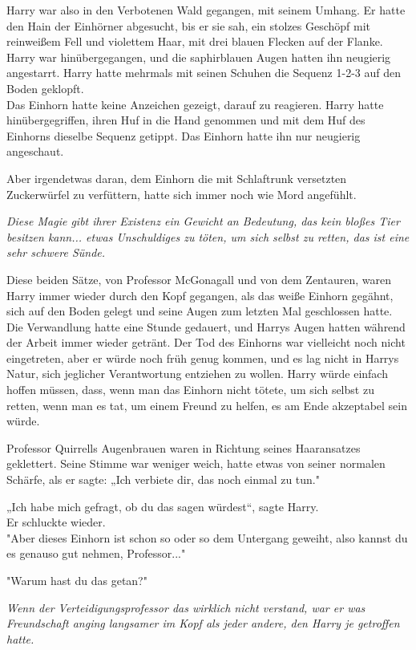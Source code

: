 {Harry war also in den Verbotenen Wald gegangen, mit seinem Umhang. Er hatte den Hain der Einhörner abgesucht, bis er sie sah, ein stolzes Geschöpf mit reinweißem Fell und violettem Haar, mit drei blauen Flecken auf der Flanke. Harry war hinübergegangen, und die saphirblauen Augen hatten ihn neugierig angestarrt. Harry hatte mehrmals mit seinen Schuhen die Sequenz 1-2-3 auf den Boden geklopft.\\ Das Einhorn hatte keine Anzeichen gezeigt, darauf zu reagieren. Harry hatte hinübergegriffen, ihren Huf in die Hand genommen und mit dem Huf des Einhorns dieselbe Sequenz getippt. Das Einhorn hatte ihn nur neugierig angeschaut.

Aber irgendetwas daran, dem Einhorn die mit Schlaftrunk versetzten Zuckerwürfel zu verfüttern, hatte sich immer noch wie Mord angefühlt.

\emph{Diese Magie gibt ihrer Existenz ein Gewicht an Bedeutung, das kein bloßes Tier besitzen kann... etwas Unschuldiges zu töten, um sich selbst zu retten, das ist eine sehr schwere Sünde.}

Diese beiden Sätze, von Professor McGonagall und von dem Zentauren, waren Harry immer wieder durch den Kopf gegangen, als das weiße Einhorn gegähnt, sich auf den Boden gelegt und seine Augen zum letzten Mal geschlossen hatte. Die Verwandlung hatte eine Stunde gedauert, und Harrys Augen hatten während der Arbeit immer wieder getränt. Der Tod des Einhorns war vielleicht noch nicht eingetreten, aber er würde noch früh genug kommen, und es lag nicht in Harrys Natur, sich jeglicher Verantwortung entziehen zu wollen. Harry würde einfach hoffen müssen, dass, wenn man das Einhorn nicht tötete, um sich selbst zu retten, wenn man es tat, um einem Freund zu helfen, es am Ende akzeptabel sein würde.

Professor Quirrells Augenbrauen waren in Richtung seines Haaransatzes geklettert. Seine Stimme war weniger weich, hatte etwas von seiner normalen Schärfe, als er sagte: „Ich verbiete dir, das noch einmal zu tun."

„Ich habe mich gefragt, ob du das sagen würdest“, sagte Harry.\\ Er schluckte wieder.\\ "Aber dieses Einhorn ist schon so oder so dem Untergang geweiht, also kannst du es genauso gut nehmen, Professor..."

"Warum hast du das getan?"

\emph{Wenn der Verteidigungsprofessor das wirklich nicht verstand, war er was Freundschaft anging langsamer im Kopf als jeder andere, den Harry je getroffen hatte.}

}

